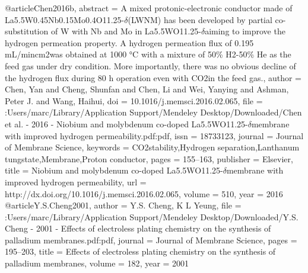 @article{Chen2016b,
abstract = {A mixed protonic-electronic conductor made of La5.5W0.45Nb0.15Mo0.4O11.25-$\delta$(LWNM) has been developed by partial co-substitution of W with Nb and Mo in La5.5WO11.25-$\delta$aiming to improve the hydrogen permeation property. A hydrogen permeation flux of 0.195 mL/mincm2was obtained at 1000 °C with a mixture of 50{\%} H2-50{\%} He as the feed gas under dry condition. More importantly, there was no obvious decline of the hydrogen flux during 80 h operation even with CO2in the feed gas.},
author = {Chen, Yan and Cheng, Shunfan and Chen, Li and Wei, Yanying and Ashman, Peter J. and Wang, Haihui},
doi = {10.1016/j.memsci.2016.02.065},
file = {:Users/marc/Library/Application Support/Mendeley Desktop/Downloaded/Chen et al. - 2016 - Niobium and molybdenum co-doped La5.5WO11.25-$\delta$membrane with improved hydrogen permeability.pdf:pdf},
issn = {18733123},
journal = {Journal of Membrane Science},
keywords = {CO2stability,Hydrogen separation,Lanthanum tungstate,Membrane,Proton conductor},
pages = {155--163},
publisher = {Elsevier},
title = {{Niobium and molybdenum co-doped La5.5WO11.25-$\delta$membrane with improved hydrogen permeability}},
url = {http://dx.doi.org/10.1016/j.memsci.2016.02.065},
volume = {510},
year = {2016}
}
@article{Y.S.Cheng2001,
author = {{Y.S. Cheng}, K L Yeung},
file = {:Users/marc/Library/Application Support/Mendeley Desktop/Downloaded/Y.S. Cheng - 2001 - Effects of electroless plating chemistry on the synthesis of palladium membranes.pdf:pdf},
journal = {Journal of Membrane Science},
pages = {195--203},
title = {{Effects of electroless plating chemistry on the synthesis of palladium membranes}},
volume = {182},
year = {2001}
}
